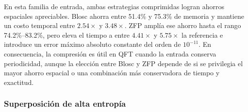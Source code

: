 En esta familia de entrada, ambas estrategias comprimidas logran ahorros espaciales
apreciables. Blosc ahorra entre 51.4\% y 75.3\% de memoria y mantiene un costo temporal entre
$2.54\times$ y $3.48\times$. ZFP amplía ese ahorro hasta el rango 74.2\%--83.2\%, pero eleva
el tiempo a entre $4.41\times$ y $5.75\times$ la referencia e introduce un error máximo
absoluto constante del orden de $10^{-11}$. En consecuencia, la compresión es útil en QFT
cuando la entrada conserva periodicidad, aunque la elección entre Blosc y ZFP depende de si se
privilegia el mayor ahorro espacial o una combinación más conservadora de tiempo y exactitud.

\subsubsection{Superposición de alta entropía}

\begin{table}[H]
    \centering
    \small
    \setlength{\tabcolsep}{3pt}
    \caption{QFT con superposición de alta entropía}
    \label{tab:qft-random-results}
\end{table}

